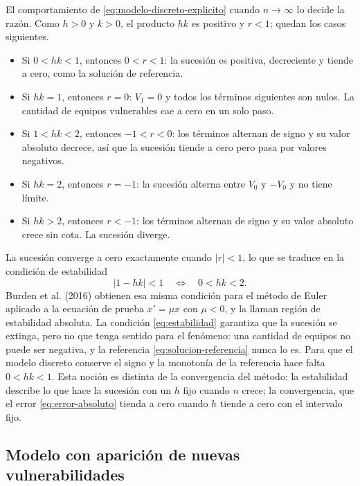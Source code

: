 El comportamiento de \eqref{eq:modelo-discreto-explicito} cuando $n \to \infty$ lo decide la
razón. Como $h > 0$ y $k > 0$, el producto $hk$ es positivo y $r < 1$; quedan los casos
siguientes.
\begin{itemize}
  \item Si $0 < hk < 1$, entonces $0 < r < 1$: la sucesión es positiva, decreciente y tiende a
        cero, como la solución de referencia.
  \item Si $hk = 1$, entonces $r = 0$: $V_1 = 0$ y todos los términos siguientes son nulos. La
        cantidad de equipos vulnerables cae a cero en un solo paso.
  \item Si $1 < hk < 2$, entonces $-1 < r < 0$: los términos alternan de signo y su valor
        absoluto decrece, así que la sucesión tiende a cero pero pasa por valores negativos.
  \item Si $hk = 2$, entonces $r = -1$: la sucesión alterna entre $V_0$ y $-V_0$ y no tiene
        límite.
  \item Si $hk > 2$, entonces $r < -1$: los términos alternan de signo y su valor absoluto crece
        sin cota. La sucesión diverge.
\end{itemize}
La sucesión converge a cero exactamente cuando $\lvert r \rvert < 1$, lo que se traduce en la
condición de estabilidad
\begin{equation}
  \lvert 1 - hk \rvert < 1 \quad \Longleftrightarrow \quad 0 < hk < 2 .
  \label{eq:estabilidad}
\end{equation}
Burden et al. (2016) obtienen esa misma condición para el método de Euler aplicado a la
ecuación de prueba $x' = \mu x$ con $\mu < 0$, y la llaman región de estabilidad absoluta.
La condición \eqref{eq:estabilidad} garantiza que la sucesión se extinga, pero no que tenga
sentido para el fenómeno: una cantidad de equipos no puede ser negativa, y la referencia
\eqref{eq:solucion-referencia} nunca lo es. Para que el modelo discreto conserve el signo y la
monotonía de la referencia hace falta $0 < hk < 1$. Esta noción es distinta de la convergencia
del método: la estabilidad describe lo que hace la sucesión con un $h$ fijo cuando $n$ crece; la
convergencia, que el error \eqref{eq:error-absoluto} tienda a cero cuando $h$ tiende a cero con
el intervalo fijo.

\subsection{Modelo con aparición de nuevas vulnerabilidades}
\label{subsec:nuevas-vulnerabilidades}

